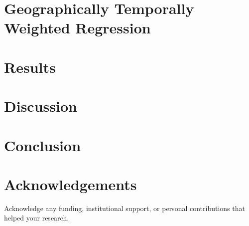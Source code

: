 \documentclass[12pt,twoside]{article}
\begin{document}
\section{Geographically Temporally Weighted Regression}
\label{sec:method}



\section{Results}
\label{sec:result}

\section{Discussion}
\label{sec:discuss}

\section{Conclusion}
\label{sec:conclusion}

\section*{Acknowledgements}
Acknowledge any funding, institutional support, or personal contributions that helped your research.


\end{document}
